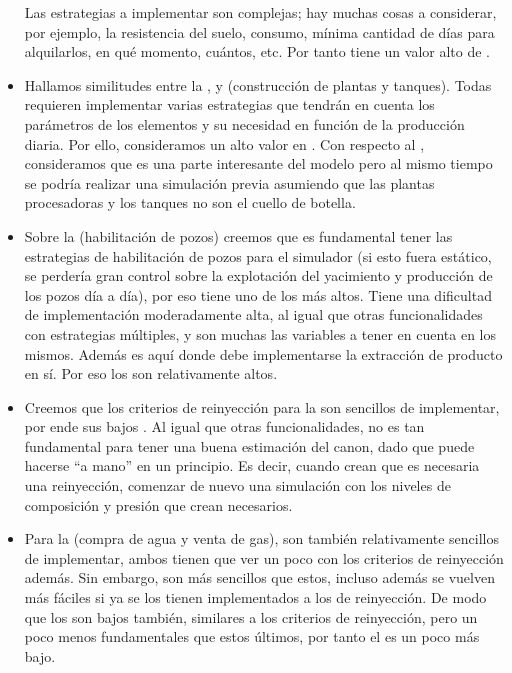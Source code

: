 \begin{itemize}
	Las estrategias a implementar son complejas; hay muchas cosas a considerar, por ejemplo, la resistencia del suelo, consumo, mínima cantidad de días para alquilarlos, en qué momento, cuántos, etc. Por tanto tiene un valor alto de \SP{}.

	\item Hallamos similitudes entre la ,  y  (construcción de plantas y tanques). Todas requieren implementar varias estrategias que tendrán en cuenta los parámetros de los elementos y su necesidad en función de la producción diaria. Por ello, consideramos un alto valor en \SP{}. Con respecto al \BV{}, consideramos que es una parte interesante del modelo pero al mismo tiempo se podría realizar una simulación previa asumiendo que las plantas procesadoras y los tanques no son el cuello de botella.

  \item Sobre la  (habilitación de pozos) creemos que es fundamental tener las estrategias de habilitación de pozos para el simulador (si esto fuera estático, se perdería gran control sobre la explotación del yacimiento y producción de los pozos día a día), por eso tiene uno de los \BV{} más altos. Tiene una dificultad de implementación moderadamente alta, al igual que otras funcionalidades con estrategias múltiples, y son muchas las variables a tener en cuenta en los mismos. Además es aquí donde debe implementarse la extracción de producto en sí. Por eso los \SP{} son relativamente altos. 

  \item Creemos que los criterios de reinyección para la  son sencillos de implementar, por ende sus bajos \SP{}. Al igual que otras funcionalidades, no es tan fundamental para tener una buena estimación del canon, dado que puede hacerse ``a mano'' en un principio. Es decir, cuando crean que es necesaria una reinyección, comenzar de nuevo una simulación con los niveles de composición y presión que crean necesarios.

  \item Para la  (compra de agua y venta de gas), son también relativamente sencillos de implementar, ambos tienen que ver un poco con los criterios de reinyección además. Sin embargo, son más sencillos que estos, incluso además se vuelven más fáciles si ya se los tienen implementados a los de reinyección. De modo que los \SP{} son bajos también, similares a los criterios de reinyección, pero un poco menos fundamentales que estos últimos, por tanto el \BV{} es un poco más bajo. 


\end{itemize}
